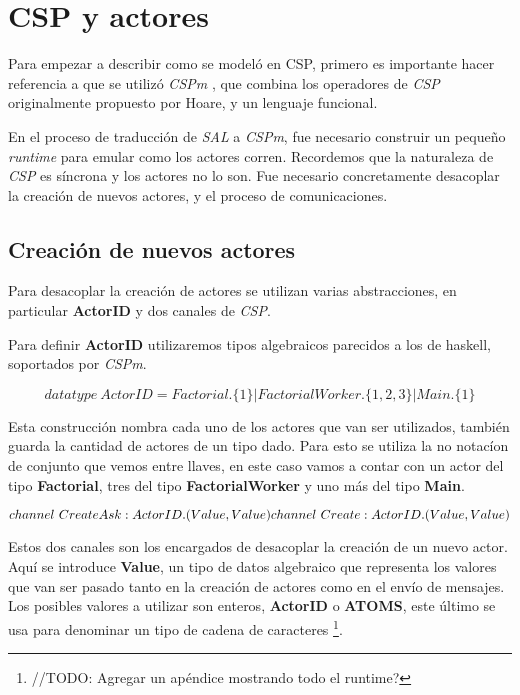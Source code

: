 \documentclass[fleqn]{article}
\begin{document}
\section{CSP y actores}
Para empezar a describir como se modeló en CSP, primero es importante hacer
referencia a que se utilizó \textit{CSPm} \cite{fdr}, que combina los operadores de \textit{CSP}
originalmente propuesto por Hoare\cite{Hoare:1978:CSP:359576.359585}, y un lenguaje funcional.

En el proceso de traducción de \textit{SAL} a \textit{CSPm}, fue necesario construir un pequeño
\textit{runtime} para emular como los actores corren. Recordemos que la
naturaleza de \textit{CSP} es síncrona y los actores no lo son. Fue necesario
concretamente desacoplar la creación de nuevos actores, y el proceso de comunicaciones. 

\subsection{Creación de nuevos actores}

Para desacoplar la creación de actores se utilizan varias abstracciones, en particular
\textbf{ActorID} y dos canales de \textit{CSP}.

Para definir \textbf{ActorID} utilizaremos tipos algebraicos parecidos a los de
haskell, soportados por \textit{CSPm}.

\[
datatype\ ActorID = Factorial.\{1\} | FactorialWorker.\{1,2,3\} | Main.\{1\}
\]

Esta construcción nombra cada uno de los actores que van ser utilizados, también
guarda la cantidad de actores de un tipo dado.
Para esto se utiliza la no notacíon de conjunto que vemos entre llaves, en este
caso vamos a contar con un actor del tipo \textbf{Factorial}, tres del tipo
\textbf{FactorialWorker} y uno más del tipo \textbf{Main}.

\[
channel\ CreateAsk:ActorID.(Value, Value)\\
channel\ Create:ActorID.(Value, Value)
\]

Estos dos canales son los encargados de desacoplar la creación de un nuevo
actor. Aquí se introduce \textbf{Value}, un tipo de datos algebraico que
representa los valores que van ser pasado tanto en la creación de actores como en
el envío de mensajes. Los posibles valores a utilizar son enteros, \textbf{ActorID} o
\textbf{ATOMS}, este último se usa para denominar un tipo de cadena de
caracteres \footnote{//TODO: Agregar un apéndice mostrando todo el runtime?}. 
\end{document}
